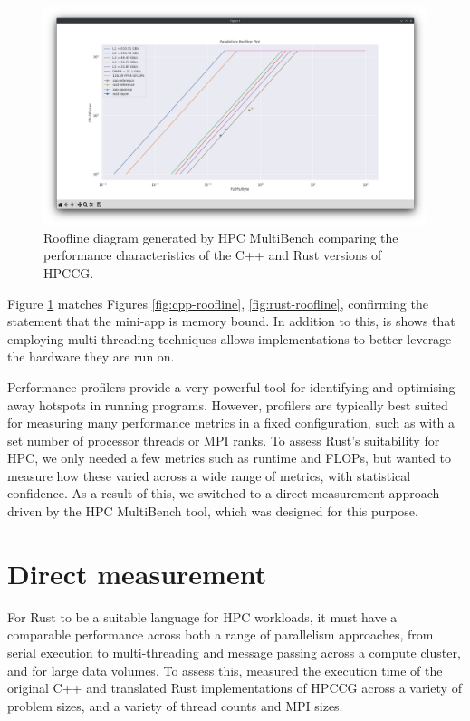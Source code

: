 \begin{figure}[H]
    \centering
    \includegraphics[width=\textwidth]{images/4_tooling/interactive_screenshots/hpc-multibench-roofline-matplotlib.png}
    \caption{Roofline diagram generated by HPC MultiBench comparing the performance characteristics of the C++ and Rust versions of \acrshort{HPCCG}.}
    \label{fig:hpc-multibench-roofline}
\end{figure}

Figure \ref{fig:hpc-multibench-roofline} matches Figures \ref{fig:cpp-roofline}, \ref{fig:rust-roofline}, confirming the statement that the \acrshort{mini-app} is memory bound. In addition to this, is shows that employing multi-threading techniques allows implementations to better leverage the hardware they are run on.

Performance profilers provide a very powerful tool for identifying and optimising away hotspots in running programs. However, profilers are typically best suited for measuring many performance metrics in a fixed configuration, such as with a set number of processor threads or MPI ranks. To assess Rust's suitability for \acrshort{HPC}, we only needed a few metrics such as runtime and \acrshort{FLOPs}, but wanted to measure how these varied across a wide range of metrics, with statistical confidence. As a result of this, we switched to a direct measurement approach driven by the HPC MultiBench tool, which was designed for this purpose.

\section{Direct measurement}
\label{sec:direct-measurement}

For Rust to be a suitable language for \acrshort{HPC} workloads, it must have a comparable performance across both a range of parallelism approaches, from serial execution to multi-threading and message passing across a compute cluster, and for large data volumes. To assess this, measured the execution time of the original C++ and translated Rust implementations of \acrshort{HPCCG} across a variety of problem sizes, and a variety of thread counts and MPI sizes.

